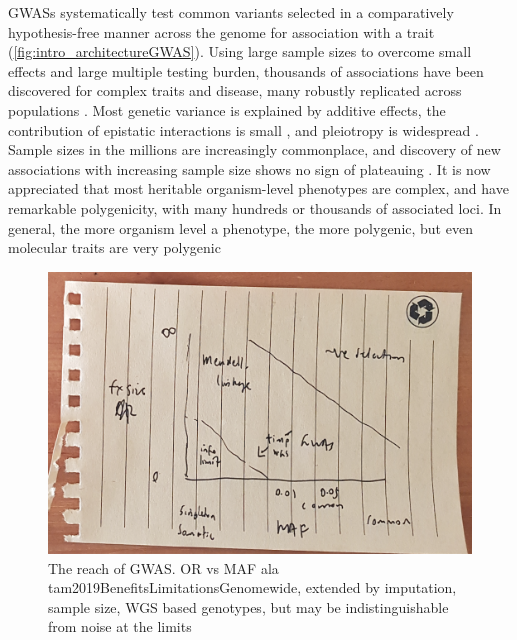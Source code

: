 \begin{outline}
\1 \Glspl{GWAS} systematically test common variants selected in a comparatively hypothesis-free manner across the genome for association with a trait (\autoref{fig:intro_architectureGWAS}).
Using large sample sizes to overcome small effects and large multiple testing burden, thousands of associations have been discovered for complex traits and disease,
many robustly replicated across populations \autocite{visscher2012FiveYearsGWAS,visscher201710YearsGWAS}.
Most genetic variance is explained by additive effects, the contribution of epistatic interactions is small \autocite{visscher2019Fisher1918Paper}, 
and pleiotropy is widespread \autocite{visscher2012FiveYearsGWAS}.
Sample sizes in the millions are increasingly commonplace, 
and discovery of new associations with increasing sample size shows no sign of plateauing \autocite{tam2019BenefitsLimitationsGenomewide}.
It is now appreciated that most heritable organism-level phenotypes are complex, and have remarkable polygenicity, with many hundreds or thousands of associated loci.
    \2 In general, the more organism level a phenotype, the more polygenic, but even molecular traits are very polygenic

\begin{figure}
    \centering
    \includegraphics[width=1.0\textwidth,page=1]{mainmatter/figures/chapter_01/fig_mockup_architecture_Screenshot 2020-05-21 at 17.08.41.png}
    \caption{The reach of GWAS. OR vs MAF ala tam2019BenefitsLimitationsGenomewide, extended by imputation, sample size, WGS based genotypes, but may be indistinguishable from noise at the limits}
    \label{fig:intro_architectureGWAS}
\end{figure}


\end{outline}
